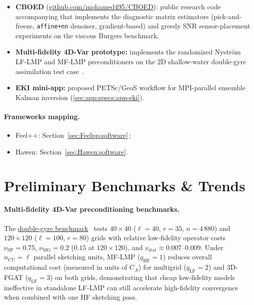 \begin{itemize}
\item \textbf{CBOED} (\href{https://github.com/mohamed495/CBOED}{github.com/mohamed495/CBOED}):
  public research code accompanying \cite{hal-05768497} that
  implements the diagnostic matrix estimators (pick-and-freeze, \texttt{affine+nn}
  denoiser, gradient-based) and greedy SNR sensor-placement experiments on the
  viscous Burgers benchmark.
\item \textbf{Multi-fidelity 4D-Var prototype:} implements the randomized
  Nyström LF-LMP and MF-LMP preconditioners on the 2D shallow-water
  double-gyre assimilation test case~\cite{hal-05874752}.
\item \textbf{EKI mini-app:} proposed PETSc/GeoS workflow for MPI-parallel
  ensemble Kalman inversion (\cref{sec:app:specs:app-eki}).
\end{itemize}

\paragraph{Frameworks mapping.}
\begin{itemize}
\item Feel++: Section~\ref{sec:Feelpp:software}\,;
\item Hawen: Section~\ref{sec:Hawen:software}.
\end{itemize}

\section{Preliminary Benchmarks \& Trends}
\label{sec:wp4:benchmarks}

\paragraph{Multi-fidelity 4D-Var preconditioning benchmarks.}
The \hyperref[sec:wp4:double-gyre]{double-gyre benchmark}~\cite{hal-05874752}
tests $40 \times 40$ ($\ell = 40$, $r = 35$, $n = 4\,880$) and $120 \times 120$
($\ell = 100$, $r = 80$) grids with relative low-fidelity operator costs
$\nu_{\mathrm{SP}} = 0.75$, $\nu_{\mathrm{MG}} = 0.2$ ($0.15$ at $120 \times 120$),
and $\nu_{\mathrm{stat}} \approx 0.007$--$0.009$. Under $n_{\mathrm{CU}} = \ell$
parallel sketching units, MF-LMP ($q_{\mathrm{HF}} = 1$) reduces overall
computational cost (measured in units of $C_A$) for multigrid ($q_{\mathrm{LF}} = 2$)
and 3D-FGAT ($q_{\mathrm{LF}} = 3$) on both grids, demonstrating that cheap
low-fidelity models ineffective in standalone LF-LMP can still accelerate
high-fidelity convergence when combined with one HF sketching pass.

